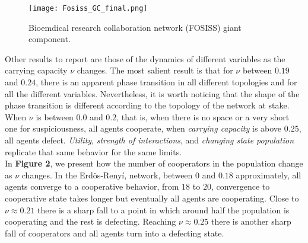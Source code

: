 \documentclass[11pt]{article}
\begin{document}
\begin{figure} [h!]
\centering
\texttt{[image: Fosiss\_GC\_final.png]}
\caption{Bioemdical research collaboration network (FOSISS) giant component.}\label{Fosiss_GC}
\end{figure}

\FloatBarrier

Other results to report are those of the dynamics of different
variables as the carrying capacity $\nu$ changes. The  most salient
result is that for $\nu$ between $0.19$ and $0.24$, there is an
apparent phase transition in all different topologies and for all the
different variables. Nevertheless, it is worth noticing that the shape
of the phase transition is different according to the topology of the
network at stake. When $\nu$ is between $0.0$ and $0.2$, that is, when there is
no space or a very short one for suspiciousness, all agents cooperate, when
\textit{carrying capacity} is above $0.25$, all agents defect. \textit{Utility},
\textit{strength of interactions}, and \textit{changing state population}
replicate that same behavior for the same limits. \\ 

In \textbf{Figure 2}, we present how the number of cooperators in the population
change as $\nu$ changes. In the Erd\"{o}s-Reny\'i, network, between $0$ and
$0.18$ approximately, all agents converge to a cooperative behavior, from $18$
to $20$, convergence to cooperative state takes longer but eventually all agents
are cooperating. Close to $\nu \approx 0.21$ there is a sharp fall to a point in
which around half the population is cooperating and the rest is
defecting. Reaching $\nu \approx 0.25$ there is another sharp fall of
cooperators and all agents turn into a defecting state.\\
\end{document}
